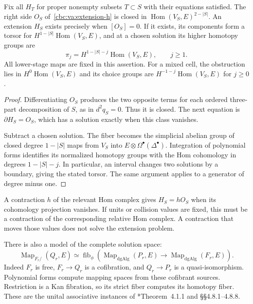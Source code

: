 \begin{proposition}\label{cbc:va:extension-obstruction}
Fix all $H_T$ for proper nonempty subsets $T\subset S$
with their equations satisfied. The right side
$O_S$ of~\eqref{cbc:va:extension-h} is closed in
$\operatorname{Hom}(V_S,E)^{2-|S|}$.
An extension $H_S$ exists precisely when $[O_S]=0$.
If it exists, its components form a torsor for
$H^{1-|S|}\operatorname{Hom}(V_S,E)$, and at
a chosen solution its higher homotopy groups are
\[
 \pi_j=H^{1-|S|-j}\operatorname{Hom}(V_S,E),
                         \qquad j\geq1.
\]
All lower-stage maps are fixed in this assertion.
For a mixed cell, the obstruction lies in
$H^0\operatorname{Hom}(V_S,E)$ and its choice
groups are $H^{-1-j}\operatorname{Hom}(V_S,E)$
for $j\geq0$.
\end{proposition}
\begin{proof}
Differentiating $O_S$ produces the two opposite
terms for each ordered three-part decomposition
of $S$, as in $d^2q_S=0$. Thus it is closed.
The next equation is $\partial H_S=O_S$, which
has a solution exactly when this class vanishes.

Subtract a chosen solution. The fiber becomes the
simplicial abelian group of closed degree
$1-|S|$ maps from $V_S$ into
$E\otimes\Omega^\bullet(\Delta^\bullet)$.
Integration of polynomial forms identifies its
normalized homotopy groups with the Hom
cohomology in degrees $1-|S|-j$.
In particular, an interval changes two solutions
by a boundary, giving the stated torsor.
The same argument applies to a generator of
degree minus one.
\end{proof}

A contraction $h$ of the relevant Hom complex
gives $H_S=hO_S$ when its cohomology projection
vanishes. If units or collision values are fixed,
this must be a contraction of the corresponding
relative Hom complex. A contraction that moves
those values does not solve the extension problem.

There is also a model of the complete solution
space:
\begin{equation}\label{cbc:va:full-extension-fibre}
 \operatorname{Map}_{F_r/}(Q_r,E)
 \simeq
 \operatorname{fib}_{\phi}
 \left(
 \operatorname{Map}_{\mathrm{dgAlg}}(P_r,E)
 \longrightarrow
 \operatorname{Map}_{\mathrm{dgAlg}}(F_r,E)
 \right).
\end{equation}
Indeed $F_r$ is free, $F_r\to Q_r$ is a
cofibration, and $Q_r\to P_r$ is a
quasi-isomorphism. Polynomial forms compute
mapping spaces from these cofibrant sources.
Restriction is a Kan fibration, so its strict
fiber computes its homotopy fiber. These are
the unital associative instances of
\cite{Hinich1997}*{Theorem~4.1.1 and \S\S4.8.1--4.8.8}.

